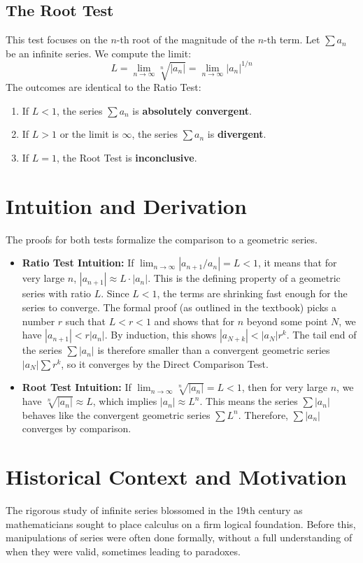 \documentclass{article}
\begin{document}
\subsection{The Root Test}
This test focuses on the $n$-th root of the magnitude of the $n$-th term. Let $\sum a_n$ be an infinite series. We compute the limit:
\[ L = \lim_{n \to \infty} \sqrt[n]{|a_n|} = \lim_{n \to \infty} |a_n|^{1/n} \]
The outcomes are identical to the Ratio Test:
\begin{enumerate}
    \item If $L < 1$, the series $\sum a_n$ is \textbf{absolutely convergent}.
    \item If $L > 1$ or the limit is $\infty$, the series $\sum a_n$ is \textbf{divergent}.
    \item If $L = 1$, the Root Test is \textbf{inconclusive}.
\end{enumerate}

\section{Intuition and Derivation}
The proofs for both tests formalize the comparison to a geometric series.
\begin{itemize}
    \item \textbf{Ratio Test Intuition:} If $\lim_{n \to \infty} |a_{n+1}/a_n| = L < 1$, it means that for very large $n$, $|a_{n+1}| \approx L \cdot |a_n|$. This is the defining property of a geometric series with ratio $L$. Since $L<1$, the terms are shrinking fast enough for the series to converge. The formal proof (as outlined in the textbook) picks a number $r$ such that $L < r < 1$ and shows that for $n$ beyond some point $N$, we have $|a_{n+1}| < r|a_n|$. By induction, this shows $|a_{N+k}| < |a_N|r^k$. The tail end of the series $\sum |a_n|$ is therefore smaller than a convergent geometric series $|a_N|\sum r^k$, so it converges by the Direct Comparison Test.
    \item \textbf{Root Test Intuition:} If $\lim_{n \to \infty} \sqrt[n]{|a_n|} = L < 1$, then for very large $n$, we have $\sqrt[n]{|a_n|} \approx L$, which implies $|a_n| \approx L^n$. This means the series $\sum |a_n|$ behaves like the convergent geometric series $\sum L^n$. Therefore, $\sum |a_n|$ converges by comparison.
\end{itemize}

\section{Historical Context and Motivation}
The rigorous study of infinite series blossomed in the 19th century as mathematicians sought to place calculus on a firm logical foundation. Before this, manipulations of series were often done formally, without a full understanding of when they were valid, sometimes leading to paradoxes.
\end{document}
